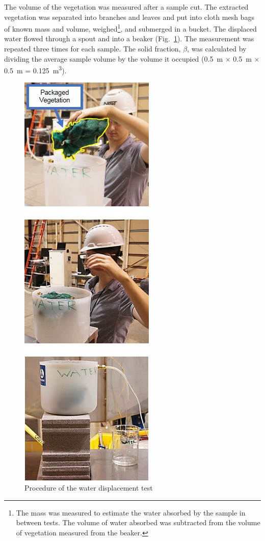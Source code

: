 \documentclass[12pt]{article}
\begin{document}
The volume of the vegetation was measured after a sample cut. The extracted vegetation was separated into branches and leaves and put into cloth mesh bags of known mass and volume, weighed\footnote{The mass was measured to estimate the water absorbed by the sample in between tests. The volume of water absorbed was subtracted from the volume of vegetation measured from the beaker.}, and submerged in a bucket. The displaced water flowed through a spout and into a beaker (Fig.~\ref{fig:wdt}). The measurement was repeated three times for each sample. The solid fraction, $\beta$, was calculated by dividing the average sample volume by the volume it occupied (0.5~\si{m} $\times$ 0.5~\si{m} $\times$ 0.5~\si{m} = 0.125~\si{m^{3}}).


\begin{figure} [!]
	\centering 	\includegraphics[height=0.95\textheight,keepaspectratio]{Picture7.jpg}
	\caption{Procedure of the water displacement test}
	\label{fig:wdt}
\end{figure}
\end{document}
